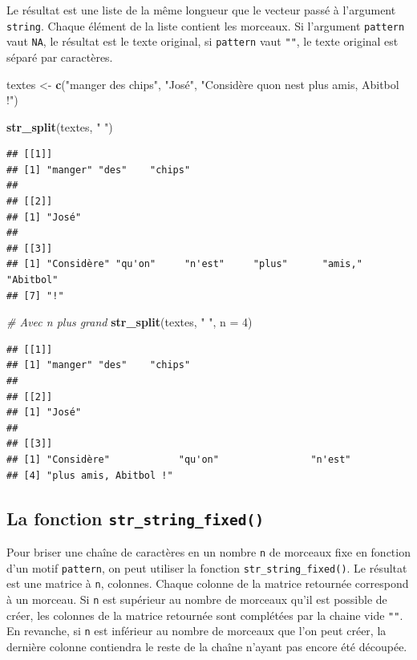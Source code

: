 \documentclass[
  11pt,
]{book}
\newenvironment{Shaded}{\begin{snugshade}}{\end{snugshade}}
\newcommand{\CommentTok}[1]{\textcolor[rgb]{0.56,0.35,0.01}{\textit{#1}}}
\newcommand{\DataTypeTok}[1]{\textcolor[rgb]{0.13,0.29,0.53}{#1}}
\newcommand{\DecValTok}[1]{\textcolor[rgb]{0.00,0.00,0.81}{#1}}
\newcommand{\KeywordTok}[1]{\textcolor[rgb]{0.13,0.29,0.53}{\textbf{#1}}}
\newcommand{\NormalTok}[1]{#1}
\newcommand{\StringTok}[1]{\textcolor[rgb]{0.31,0.60,0.02}{#1}}
\numberwithin{equation}{section}
\numberwithin{countremarque}{section}
\begin{document}
Le résultat est une liste de la même longueur que le vecteur passé à l'argument \texttt{string}. Chaque élément de la liste contient les morceaux. Si l'argument \texttt{pattern} vaut \texttt{NA}, le résultat est le texte original, si \texttt{pattern} vaut \texttt{""}, le texte original est séparé par caractères.

\begin{Shaded}
\begin{Highlighting}[]
\NormalTok{textes \textless{}{-}}\StringTok{ }\KeywordTok{c}\NormalTok{(}\StringTok{"manger des chips"}\NormalTok{, }\StringTok{"José"}\NormalTok{,}
            \StringTok{"Considère qu\textquotesingle{}on n\textquotesingle{}est plus amis, Abitbol !"}\NormalTok{)}

\KeywordTok{str\_split}\NormalTok{(textes, }\StringTok{" "}\NormalTok{)}
\end{Highlighting}
\end{Shaded}

\begin{lstlisting}
## [[1]]
## [1] "manger" "des"    "chips" 
## 
## [[2]]
## [1] "José"
## 
## [[3]]
## [1] "Considère" "qu'on"     "n'est"     "plus"      "amis,"     "Abitbol"  
## [7] "!"
\end{lstlisting}

\begin{Shaded}
\begin{Highlighting}[]
\CommentTok{\# Avec n plus grand}
\KeywordTok{str\_split}\NormalTok{(textes, }\StringTok{" "}\NormalTok{, }\DataTypeTok{n =} \DecValTok{4}\NormalTok{)}
\end{Highlighting}
\end{Shaded}

\begin{lstlisting}
## [[1]]
## [1] "manger" "des"    "chips" 
## 
## [[2]]
## [1] "José"
## 
## [[3]]
## [1] "Considère"            "qu'on"                "n'est"               
## [4] "plus amis, Abitbol !"
\end{lstlisting}

\hypertarget{manip_regex_stringr_split_fixed}{%
\subsection{\texorpdfstring{La fonction \texttt{str\_string\_fixed()}}{La fonction str\_string\_fixed()}}\label{manip_regex_stringr_split_fixed}}

Pour briser une chaîne de caractères en un nombre \texttt{n} de morceaux fixe en fonction d'un motif \texttt{pattern}, on peut utiliser la fonction \texttt{str\_string\_fixed()}. Le résultat est une matrice à \texttt{n}, colonnes. Chaque colonne de la matrice retournée correspond à un morceau. Si \texttt{n} est supérieur au nombre de morceaux qu'il est possible de créer, les colonnes de la matrice retournée sont complétées par la chaine vide \texttt{""}. En revanche, si \texttt{n} est inférieur au nombre de morceaux que l'on peut créer, la dernière colonne contiendra le reste de la chaîne n'ayant pas encore été découpée.
\end{document}
